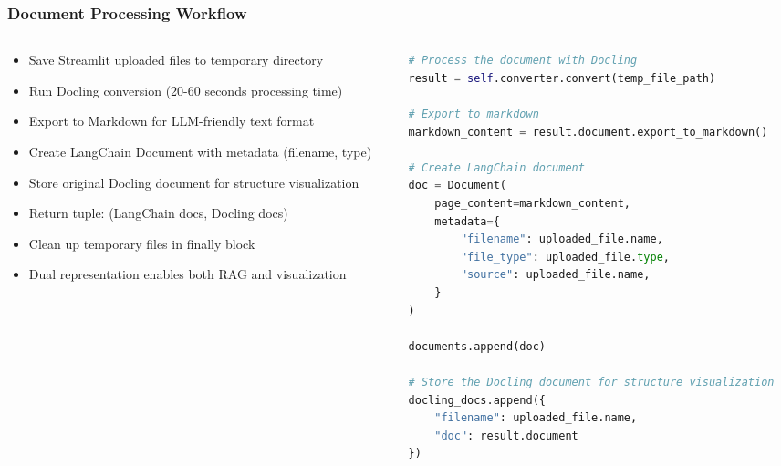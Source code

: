 \begin{frame}[fragile]\frametitle{Document Processing Workflow}
\begin{columns}
    \begin{column}[T]{0.5\linewidth}
      \begin{itemize}
        \item Save Streamlit uploaded files to temporary directory
        \item Run Docling conversion (20-60 seconds processing time)
        \item Export to Markdown for LLM-friendly text format
        \item Create LangChain Document with metadata (filename, type)
        \item Store original Docling document for structure visualization
        \item Return tuple: (LangChain docs, Docling docs)
        \item Clean up temporary files in finally block
        \item Dual representation enables both RAG and visualization
      \end{itemize}
    \end{column}
    \begin{column}[T]{0.5\linewidth}
      \begin{lstlisting}[language=python, basicstyle=\tiny]
# Process the document with Docling
result = self.converter.convert(temp_file_path)
          
# Export to markdown
markdown_content = result.document.export_to_markdown()
	  
# Create LangChain document
doc = Document(
    page_content=markdown_content,
    metadata={
        "filename": uploaded_file.name,
        "file_type": uploaded_file.type,
        "source": uploaded_file.name,
    }
)

documents.append(doc)

# Store the Docling document for structure visualization
docling_docs.append({
    "filename": uploaded_file.name,
    "doc": result.document
})
      \end{lstlisting}
    \end{column}
  \end{columns}	  
\end{frame}

